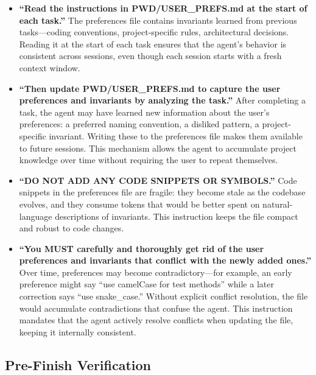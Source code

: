 \documentclass{article}
\begin{document}
\begin{itemize}[nosep]
\item \textbf{``Read the instructions in PWD/USER\_PREFS.md at the
  start of each task.''}  The preferences file contains invariants
  learned from previous tasks---coding conventions, project-specific
  rules, architectural decisions.  Reading it at the start of each
  task ensures that the agent's behavior is consistent across
  sessions, even though each session starts with a fresh context
  window.

\item \textbf{``Then update PWD/USER\_PREFS.md to capture the user
  preferences and invariants by analyzing the task.''}  After
  completing a task, the agent may have learned new information about
  the user's preferences: a preferred naming convention, a disliked
  pattern, a project-specific invariant.  Writing these to the
  preferences file makes them available to future sessions.  This
  mechanism allows the agent to accumulate project knowledge over time
  without requiring the user to repeat themselves.

\item \textbf{``DO NOT ADD ANY CODE SNIPPETS OR SYMBOLS.''}  Code
  snippets in the preferences file are fragile: they become stale as
  the codebase evolves, and they consume tokens that would be better
  spent on natural-language descriptions of invariants.  This
  instruction keeps the file compact and robust to code changes.

\item \textbf{``You MUST carefully and thoroughly get rid of the user
  preferences and invariants that conflict with the newly added
  ones.''}  Over time, preferences may become contradictory---for
  example, an early preference might say ``use camelCase for test
  methods'' while a later correction says ``use snake\_case.''
  Without explicit conflict resolution, the file would accumulate
  contradictions that confuse the agent.  This instruction mandates
  that the agent actively resolve conflicts when updating the file,
  keeping it internally consistent.
\end{itemize}

\subsection{Pre-Finish Verification}
\end{document}
